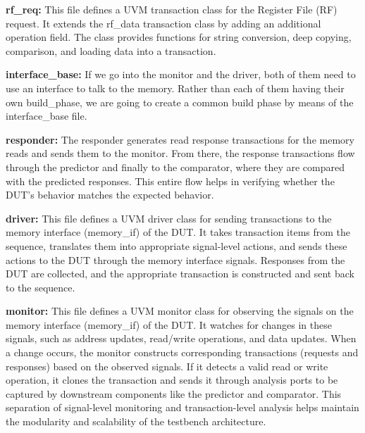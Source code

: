 \documentclass[12pt,a4paper]{report}
\begin{document}
\vspace*{0.3cm}

\textbf{rf\_req:} This file defines a UVM transaction class for the Register File (RF) request. It extends the rf\_data transaction class by adding an additional operation field. The class provides functions for string conversion, deep copying, comparison, and loading data into a transaction.

\vspace*{0.3cm}

\textbf{interface\_base:} If we go into the monitor and the driver, both of them need to use an interface to talk to the memory. Rather than each of them having their own build\_phase, we are going to create a common build phase by means of the interface\_base file. 

\vspace*{0.3cm}

\textbf{responder:} The responder generates read response transactions for the memory reads and sends them to the monitor. From there, the response transactions flow through the predictor and finally to the comparator, where they are compared with the predicted responses. This entire flow helps in verifying whether the DUT's behavior matches
the expected behavior.

\vspace*{0.3cm}

\textbf{driver:} This file defines a UVM driver class for sending transactions to the memory interface (memory\_if) of the DUT. It takes transaction items from the sequence, translates them into appropriate signal-level actions, and sends these actions to the DUT through the memory interface signals. Responses from the DUT are collected, and the appropriate transaction is constructed and sent back to the sequence.
\vspace*{0.3cm}

\textbf{monitor:} This file defines a UVM monitor class for observing the signals on the memory interface (memory\_if) of the DUT. It watches for changes in these signals, such as address updates, read/write operations, and data updates. When a change occurs, the monitor constructs corresponding transactions (requests and responses) based on the observed signals. If it detects a valid read or write operation, it clones the transaction and sends it through analysis ports to be captured by downstream components like the predictor and comparator. This separation of signal-level monitoring and transaction-level analysis helps maintain the modularity and scalability 
of the testbench architecture.
\end{document}
